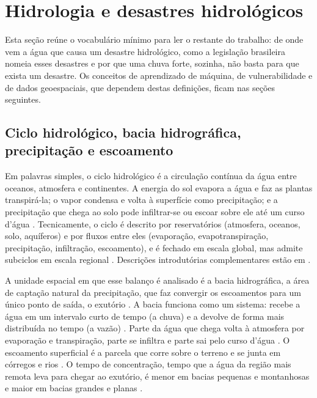 
\section{Hidrologia e desastres hidrológicos}
\label{sec:hidrologia}

Esta seção reúne o vocabulário mínimo para ler o restante do trabalho: de onde vem a água que causa um desastre hidrológico, como a legislação brasileira nomeia esses desastres e por que uma chuva forte, sozinha, não basta para que exista um desastre. Os conceitos de aprendizado de máquina, de vulnerabilidade e de dados geoespaciais, que dependem destas definições, ficam nas seções seguintes.

\subsection{Ciclo hidrológico, bacia hidrográfica, precipitação e escoamento}
\label{subsec:ciclo}

Em palavras simples, o ciclo hidrológico é a circulação contínua da água entre oceanos, atmosfera e continentes. A energia do sol evapora a água e faz as plantas transpirá-la; o vapor condensa e volta à superfície como precipitação; e a precipitação que chega ao solo pode infiltrar-se ou escoar sobre ele até um curso d'água \cite{collischonn2013}. Tecnicamente, o ciclo é descrito por reservatórios (atmosfera, oceanos, solo, aquíferos) e por fluxos entre eles (evaporação, evapotranspiração, precipitação, infiltração, escoamento), e é fechado em escala global, mas admite subciclos em escala regional \cite{collischonn2013}. Descrições introdutórias complementares estão em .

A unidade espacial em que esse balanço é analisado é a bacia hidrográfica, a área de captação natural da precipitação, que faz convergir os escoamentos para um único ponto de saída, o exutório \cite{collischonn2013}. A bacia funciona como um sistema: recebe a água em um intervalo curto de tempo (a chuva) e a devolve de forma mais distribuída no tempo (a vazão) \cite{collischonn2013}. Parte da água que chega volta à atmosfera por evaporação e transpiração, parte se infiltra e parte sai pelo curso d'água \cite{usgs_watershed}. O escoamento superficial é a parcela que corre sobre o terreno e se junta em córregos e rios \cite{usgs_runoff}. O tempo de concentração, tempo que a água da região mais remota leva para chegar ao exutório, é menor em bacias pequenas e montanhosas e maior em bacias grandes e planas \cite{collischonn2013}.

